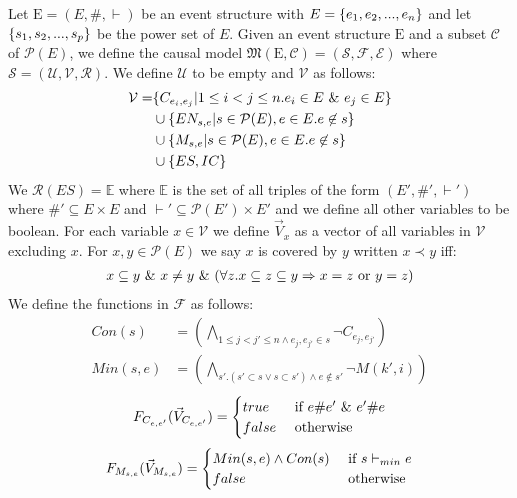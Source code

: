 Let $\mathrm{E} = (E,\#,\vdash)$ be an event structure with
$E = \{e_1, e_2, ...,e_n\}$ and let $\{s_1,s_2,...,s_p\}$ be the power set of $E$.
Given an event structure $\mathrm{E}$ and a subset $\mathcal{C}$ of
$\mathcal{P}(E)$, we define the causal model
$\mathfrak{M}(\mathrm{E},\mathcal{C}) = (\mathcal{S},\mathscr{F},\mathcal{E})$
where
$\mathcal{S} = (\mathcal{U},\mathcal{V},\mathcal{R})$.
We define $\mathcal{U}$ to be empty and $\mathcal{V}$ as follows:
\begin{align*}
    \mathcal{V} = & \{C_{e_i,e_j} |  1 \leq i < j \leq n.
    e_i \in E \ \& \  e_j \in E\}                                \\
                  & \cup \{EN_{s,e} | s \in \mathcal{P}(E),
    e \in E. e \not \in s \}                                  \\
                  & \cup \{M_{s,e} | s \in \mathcal{P}(E),
    e \in E. e \not \in s \}                                  \\
                  & \cup \{ES,IC\}
\end{align*}
We $\mathcal{R}(ES) = \mathbb{E}$ where $\mathbb{E}$ is the set of all
triples of the form $(E',\#',\vdash')$ where $\#' \subseteq E \times E$
and $\vdash' \subseteq \mathcal{P}(E') \times E'$ and we define all other
variables to be boolean.
For each variable $x \in \mathcal{V}$ we define $\vec V_x$ as a vector
of all variables in $\mathcal{V}$ excluding $x$.
For $x,y \in \mathcal{P}(E)$ we say $x$ is covered by $y$ written $ x \prec y$ iff:
\begin{align*}
    x \subseteq y \ \& \  x \neq y \ \& \ 
    (\forall z. x \subseteq z \subseteq y \Rightarrow x = z
    \text{ or } y = z)
\end{align*}
We define the functions in $\mathscr{F}$ as follows:
\begin{align*}
    Con(s)   & =   \left(
    \bigwedge_{ 1\leq j<j' \leq n \wedge e_j,e_{j'} \in s}
    \neg C_{e_j,e_{j'}}
    \right)               \\
    Min(s,e) & = \left(
    \bigwedge_{s'. (s' \subset s \vee s \subset s')
        \wedge e \notin s'}
    \neg M(k',i)
    \right)
\end{align*}
$$
    F_{C_{e,e'}}(\vec V_{C_{e,e'}}) = \begin{cases}
        true  & \text{ if } e \# e' \ \& \  e' \# e \\
        false & \text{ otherwise }
    \end{cases}
$$
$$
    F_{M_{s,e}}(\vec V_{M_{s,e}}) = \begin{cases}
        Min(s,e) \wedge Con(s) & \text{ if } s \vdash_{min} e \\
        false                  & \text{ otherwise }
    \end{cases}
$$
